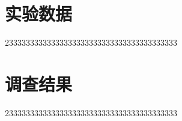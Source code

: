 \clearpage                               %
\begin{center}
	\section*{}
\end{center}

\appendix
\setcounter{tocdepth}{-1}
\section*{实验数据}
23333333333333333333333333333333333333333

\section*{调查结果}
23333333333333333333333333333333333333333